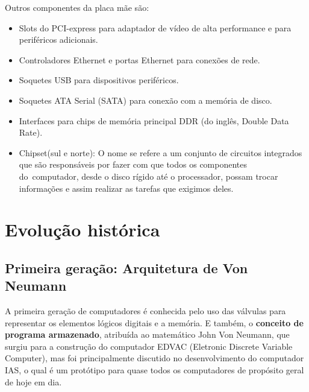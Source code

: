 \documentclass{article}
\begin{document}
Outros componentes da placa mãe são:

\begin{itemize}
    \item Slots do PCI-express para adaptador de vídeo de alta
       performance e para periféricos adicionais.

    \item Controladores Ethernet e portas Ethernet para conexões de rede.
        
    \item Soquetes USB para dispositivos periféricos.

    \item Soquetes ATA Serial (SATA) para conexão com a memória de disco.

    \item Interfaces para chips de memória principal DDR (do inglês, Double
        Data Rate).

    \item Chipset(sul e norte):  O nome se refere a um conjunto de circuitos
        integrados que são responsáveis por fazer com que todos os componentes
        do computador, desde o disco rígido até o processador, possam trocar
        informações e assim realizar as tarefas que exigimos deles.
\end{itemize}

\section{Evolução histórica}
\subsection{Primeira geração: Arquitetura de Von Neumann}
A primeira geração de computadores é conhecida pelo uso das válvulas para
representar os elementos lógicos digitais e a memória. E também, o
\textbf{conceito de programa armazenado}, atribuída ao matemático John Von
Neumann, que surgiu para a construção do computador EDVAC (Eletronic Discrete
Variable Computer), mas foi principalmente discutido no desenvolvimento do
computador IAS, o qual é um protótipo para quase todos os computadores de
propósito geral de hoje em dia.
\end{document}
